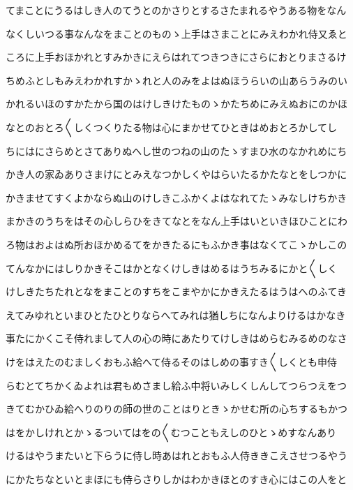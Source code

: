 \documentclass[a4paper,11pt,landscape]{ltjtarticle}
\begin{document}
\par\medskip
てまことにうるはしき人のてうとのかさりとするさたまれるやうある物をなん
\par\medskip
なくしいつる事なんなをまことのものゝ上手はさまことにみえわかれ侍又ゑと
\par\medskip
ころに上手おほかれとすみかきにえらはれてつきつきにさらにおとりまさるけ
\par\medskip
ちめふとしもみえわかれすかゝれと人のみをよはぬほうらいの山あらうみのい
\par\medskip
かれるいほのすかたから国のはけしきけたものゝかたちめにみえぬおにのかほ
\par\medskip
なとのおとろ〱しくつくりたる物は心にまかせてひときはめおとろかしてし
\par\medskip
ちにはにさらめとさてありぬへし世のつねの山のたゝすまひ水のなかれめにち
\par\medskip
かき人の家ゐありさまけにとみえなつかしくやはらいたるかたなとをしつかに
\par\medskip
かきませてすくよかならぬ山のけしきこふかくよはなれてたゝみなしけちかき
\par\medskip
まかきのうちをはその心しらひをきてなとをなん上手はいといきほひことにわ
\par\medskip
ろ物はおよはぬ所おほかめるてをかきたるにもふかき事はなくてこゝかしこの
\par\medskip
てんなかにはしりかきそこはかとなくけしきはめるはうちみるにかと〱しく
\par\medskip
けしきたちたれとなをまことのすちをこまやかにかきえたるはうはへのふてき
\par\medskip
えてみゆれといまひとたひとりならへてみれは猶しちになんよりけるはかなき
\par\medskip
事たにかくこそ侍れまして人の心の時にあたりてけしきはめらむみるめのなさ
\par\medskip
けをはえたのむましくおもふ給へて侍るそのはしめの事すき〱しくとも申侍
\par\medskip
らむとてちかくゐよれは君もめさまし給ふ中将いみしくしんしてつらつえをつ
\par\medskip
きてむかひゐ給へりのりの師の世のことはりときゝかせむ所の心ちするもかつ
\par\medskip
はをかしけれとかゝるついてはをの〱むつこともえしのひとゝめすなんあり
\par\medskip
けるはやうまたいと下らうに侍し時あはれとおもふ人侍ききこえさせつるやう
\par\medskip
にかたちなといとまほにも侍らさりしかはわかきほとのすき心にはこの人をと
\par\medskip
\end{document}
